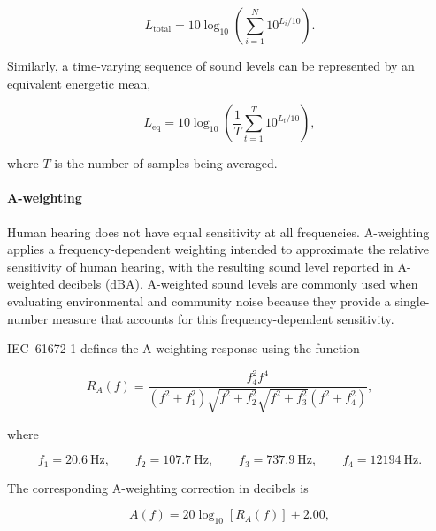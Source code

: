 \documentclass[11pt]{article}
\begin{document}
\begin{equation}
    L_{\mathrm{total}}
    =
    10\log_{10}
    \left(
        \sum_{i=1}^{N}
        10^{L_i/10}
    \right).
    \label{eq:energetic-sum}
\end{equation}

Similarly, a time-varying sequence of sound levels can be represented by an equivalent energetic mean,

\begin{equation}
    L_{\mathrm{eq}}
    =
    10\log_{10}
    \left(
        \frac{1}{T}
        \sum_{t=1}^{T}
        10^{L_t/10}
    \right),
    \label{eq:energetic-mean}
\end{equation}

where $T$ is the number of samples being averaged.

\paragraph{A-weighting}

Human hearing does not have equal sensitivity at all frequencies. A-weighting applies a frequency-dependent weighting intended to approximate the relative sensitivity of human hearing, with the resulting sound level reported in A-weighted decibels (dBA). A-weighted sound levels are commonly used when evaluating environmental and community noise because they provide a single-number measure that accounts for this frequency-dependent sensitivity.

IEC~61672-1 defines the A-weighting response using the function

\begin{equation}
R_A(f)
=
\frac{
    f_4^2 f^4
}{
    (f^2+f_1^2)
    \sqrt{f^2+f_2^2}
    \sqrt{f^2+f_3^2}
    (f^2+f_4^2)
},
\label{eq:a-weighting-response}
\end{equation}

where

\begin{equation}
    f_1 = 20.6~\mathrm{Hz}, \qquad
    f_2 = 107.7~\mathrm{Hz}, \qquad
    f_3 = 737.9~\mathrm{Hz}, \qquad
    f_4 = 12194~\mathrm{Hz}.
\end{equation}

The corresponding A-weighting correction in decibels is

\begin{equation}
A(f)
=
20\log_{10}\left[R_A(f)\right]
+ 2.00,
\label{eq:a-weighting-correction}
\end{equation}
\end{document}
